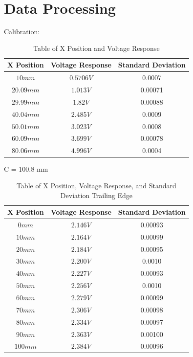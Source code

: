 \documentclass{article}
\begin{document}
\section{Data Processing}

Calibration:
\begin{table}[ht]
\centering
\begin{tabular}{|c|c|c|}
\hline
\textbf{X Position} & \textbf{Voltage Response} & \textbf{Standard Deviation} \\
\hline
$10 mm$ & $0.5706 V$ & 0.0007\\
\hline
$20.09 mm$ & $1.013 V$ & 0.00071 \\
\hline
$29.99 mm$ & $1.82 V$ & 0.00088 \\
\hline
$40.04 mm$ & $2.485 V$ & 0.0009\\
\hline
$50.01 mm$ & $3.023 V$ & 0.0008\\
\hline
$60.09 mm$ & $3.699 V$ & 0.00078\\
\hline
$80.06 mm$ & $4.996 V$ & 0.0004\\
\hline
\end{tabular}
\caption{Table of X Position and Voltage Response}
\label{tab:position_voltage}
\end{table}

C = 100.8 mm

\begin{table}[ht]
\centering
\begin{tabular}{|c|c|c|}
\hline
\textbf{X Position} & \textbf{Voltage Response} & \textbf{Standard Deviation} \\
\hline
$0 mm$ & $2.146 V$ & 0.00093 \\
\hline
$10 mm$ & $2.164 V$ & 0.00099\\
\hline
$20 mm$ & $2.184 V$ & 0.00095\\
\hline
$30 mm$ & $2.200 V$ & 0.0010 \\
\hline
$40 mm$ & $2.227 V$ & 0.00093 \\
\hline
$50 mm$ & $2.256 V$ & 0.0010 \\
\hline
$60 mm$ & $2.279 V$ & 0.00099 \\
\hline
$70 mm$ & $2.306 V$ & 0.00098 \\
\hline
$80 mm$ & $2.334 V$ & 0.00097\\
\hline
$90 mm$ & $2.363 V$ & 0.00100\\
\hline
$100 mm$ & $2.384 V$ & 0.00096\\
\hline
\end{tabular}
\caption{Table of X Position, Voltage Response, and Standard Deviation Trailing Edge}
\label{tab:position_voltage_stddev}
\end{table}
\end{document}
